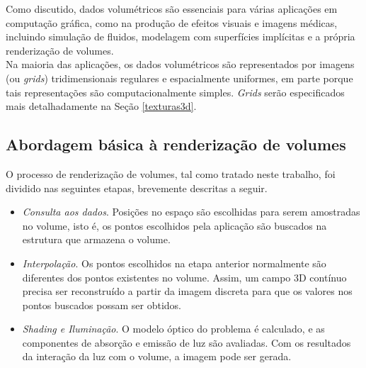 
Como discutido, dados volumétricos são essenciais para várias aplicações em computação gráfica, como na produção de efeitos visuais e imagens médicas, incluindo simulação de fluidos, modelagem com superfícies implícitas e a própria renderização de volumes. \\


Na maioria das aplicações, os dados volumétricos são representados por imagens (ou \emph{grids}) tridimensionais regulares e espacialmente uniformes, em parte porque tais representações são computacionalmente simples. \emph{Grids} serão especificados mais detalhadamente na Seção \ref{texturas3d}.

\subsection*{Abordagem básica à renderização de volumes}
\label{approach}

O processo de renderização de volumes, tal como tratado neste trabalho, foi dividido nas seguintes etapas, brevemente descritas a seguir. \\

\begin{itemize}
\item \emph{Consulta aos dados}. Posições no espaço são escolhidas para serem amostradas no volume, isto é, os pontos escolhidos pela aplicação são buscados na estrutura que armazena o volume. 

\item \emph{Interpolação}. Os pontos escolhidos na etapa anterior normalmente são diferentes dos pontos existentes no volume. Assim, um campo 3D contínuo precisa ser reconstruído a partir da imagem discreta para que os valores nos pontos buscados possam ser obtidos. 

\item \emph{Shading e Iluminação}. O modelo óptico do problema é calculado, e as componentes de absorção e emissão de luz são avaliadas. Com os resultados da interação da luz com o volume, a imagem pode ser gerada.
\end{itemize}

